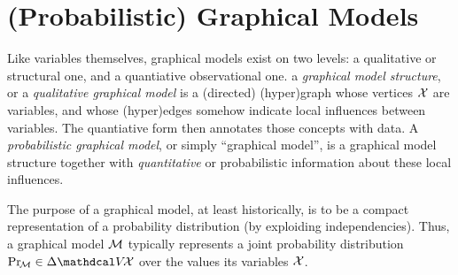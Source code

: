 



\section{(Probabilistic) Graphical Models}
    \label{sec:prelim-pgms}

Like variables themselves, graphical models exist on two levels: a qualitative or structural one, and a quantiative observational one.
%
a \emph{graphical model structure}, or a \emph{qualitative graphical model} is a (directed) (hyper)graph whose vertices $\mathcal X$ are variables, and whose (hyper)edges somehow indicate local influences between variables.
The quantiative form then annotates those concepts with data.
A \emph{probabilistic graphical model},
or simply  ``graphical model'', is a
graphical model structure together with  \emph{quantitative} or probabilistic information about these local influences.

The purpose of a graphical model, at least historically, is to be a compact representation of a probability distribution (by exploiding independencies). 
Thus, a graphical model $\cal M$
typically represents a joint probability distribution $\Pr_{\!\cal M}
 \in \Delta \V\!\X$ over the values its variables $\mathcal X$.

